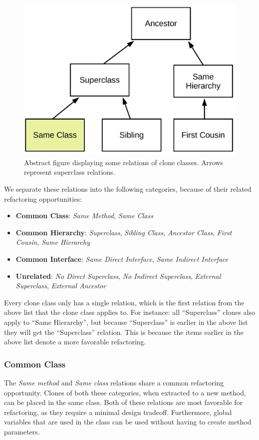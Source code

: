 \documentclass[runningheads]{llncs}
\begin{document}
\begin{figure}
  \centering
    \includegraphics[width=0.6\columnwidth]{img/Relation}
      \caption{Abstract figure displaying some relations of clone classes. Arrows represent superclass relations.}
  \label{fig:clonerelation}
\end{figure}

We separate these relations into the following categories, because of their related refactoring opportunities:
\begin{itemize}
  \item \textbf{Common Class}: \textit{Same Method}, \textit{Same Class}
  \item \textbf{Common Hierarchy}: \textit{Superclass}, \textit{Sibling Class}, \textit{Ancestor Class}, \textit{First Cousin}, \textit{Same Hierarchy}
  \item \textbf{Common Interface}: \textit{Same Direct Interface}, \textit{Same Indirect Interface}
  \item \textbf{Unrelated}: \textit{No Direct Superclass}, \textit{No Indirect Superclass}, \textit{External Superclass}, \textit{External Ancestor}
\end{itemize}

Every clone class only has a single relation, which is the first relation from the above list that the clone class applies to. For instance: all ``Superclass'' clones also apply to ``Same Hierarchy'', but because ``Superclass'' is earlier in the above list they will get the ``Superclass'' relation. This is because the items earlier in the above list denote a more favorable refactoring.


\subsubsection{Common Class}
The \textit{Same method} and \textit{Same class} relations share a common refactoring opportunity. Clones of both these categories, when extracted to a new method, can be placed in the same class. Both of these relations are most favorable for refactoring, as they require a minimal design tradeoff. Furthermore, global variables that are used in the class can be used without having to create method parameters.
\end{document}
